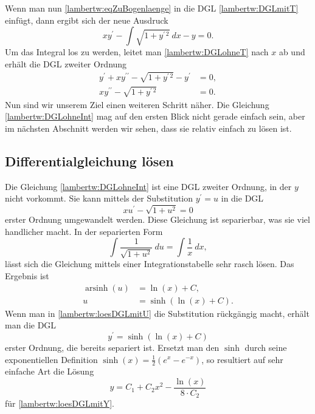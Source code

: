 Wenn man nun \eqref{lambertw:eqZuBogenlaenge} in die DGL \eqref{lambertw:DGLmitT} einfügt, dann ergibt sich der neue Ausdruck
\begin{equation}
	x y^{\prime} - \int\sqrt{1+y^{\prime\, 2}} \: dx - y
	= 0.
	\label{lambertw:DGLohneT}
\end{equation}
Um das Integral los zu werden, leitet man \eqref{lambertw:DGLohneT} nach \(x\) ab und erhält die DGL zweiter Ordnung 
\begin{align}
	y^{\prime}+ xy^{\prime\prime} - \sqrt{1+y^{\prime\, 2}} - y^{\prime}
	&= 0, \\
	xy^{\prime\prime} - \sqrt{1+y^{\prime\, 2}}
	&= 0.
	\label{lambertw:DGLohneInt}
\end{align}
Nun sind wir unserem Ziel einen weiteren Schritt näher. Die Gleichung \eqref{lambertw:DGLohneInt} mag auf den ersten Blick nicht gerade einfach sein, aber im nächsten Abschnitt werden wir sehen, dass sie relativ einfach zu lösen ist.

\subsection{Differentialgleichung lösen
	\label{lambertw:subsection:DGLloes}}
Die Gleichung \eqref{lambertw:DGLohneInt} ist eine DGL zweiter Ordnung, in der \(y\) nicht vorkommt. Sie kann mittels der Substitution \(y^{\prime} = u\) in die DGL
\begin{equation}
	xu^{\prime} - \sqrt{1+u^2}
	= 0
	\label{lambertw:DGLmitU}
\end{equation}
erster Ordnung umgewandelt werden.
Diese Gleichung ist separierbar, was sie viel handlicher macht. In der separierten Form
\begin{equation}
	\int{\frac{1}{\sqrt{1+u^2}}\:du} 
	= 
	\int{\frac{1}{x}\:dx},
\end{equation}
lässt sich die Gleichung mittels einer Integrationstabelle sehr rasch lösen. 
Das Ergebnis ist 
\begin{align}
	\operatorname{arsinh}(u)
	&=
	\operatorname{ln}(x) + C, \\
	u
	&=
	\operatorname{sinh}(\operatorname{ln}(x) + C).
	\label{lambertw:loesDGLmitU}
\end{align}
Wenn man in \eqref{lambertw:loesDGLmitU} die Substitution rückgängig macht, erhält man die DGL 
\begin{equation}
	y^{\prime}
	=
	\operatorname{sinh}(\operatorname{ln}(x) + C)
	\label{lambertw:loesDGLmitY}
\end{equation}
erster Ordnung, die bereits separiert ist.
Ersetzt man den \(\operatorname{sinh}\) durch seine exponentiellen Definition \(\operatorname{sinh}(x)=\frac{1}{2}(e^x-e^{-x})\), so resultiert auf sehr einfache Art die Lösung 
\begin{equation}
	y
	=
	C_1 + C_2 x^2 - \frac{\operatorname{ln}(x)}{8 \cdot C_2}
\end{equation}
für \eqref{lambertw:loesDGLmitY}.

